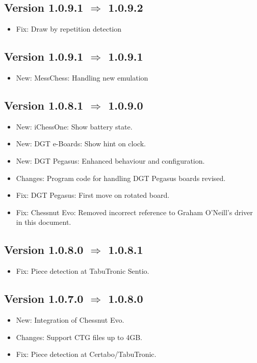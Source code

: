 \documentclass[11pt,a4paper]{article}
\begin{document}
\subsection*{Version 1.0.9.1 $\Rightarrow$  1.0.9.2}
\begin{itemize}			
	\item {\color{red}Fix}: Draw by repetition detection
\end{itemize}


\subsection*{Version 1.0.9.1 $\Rightarrow$  1.0.9.1}
\begin{itemize}			
	\item {\color{blue}New}: MessChess: Handling new emulation
\end{itemize}


\subsection*{Version 1.0.8.1 $\Rightarrow$  1.0.9.0}
\begin{itemize}			
	\item {\color{blue}New}: iChessOne: Show battery state.
	\item {\color{blue}New}: DGT e-Boards: Show hint on clock.
	\item {\color{blue}New}: DGT Pegasus: Enhanced behaviour and configuration.
	\item {\color{teal}Changes}: Program code for handling DGT Pegasus boards revised.
	\item {\color{red}Fix}: DGT Pegasus: First move on rotated board.
    \item {\color{red}Fix}: Chessnut Evo: Removed incorrect reference to Graham O'Neill's driver in this document.
\end{itemize}


\subsection*{Version 1.0.8.0 $\Rightarrow$  1.0.8.1}
\begin{itemize}			
	\item {\color{red}Fix}: Piece detection at TabuTronic Sentio. 
\end{itemize}


\subsection*{Version 1.0.7.0 $\Rightarrow$  1.0.8.0}
\begin{itemize}			
	\item {\color{blue}New}: Integration of Chessnut Evo.
    \item {\color{teal}Changes}: Support CTG files up to 4GB.
    \item {\color{red}Fix}: Piece detection at Certabo/TabuTronic.
\end{itemize}
\end{document}
